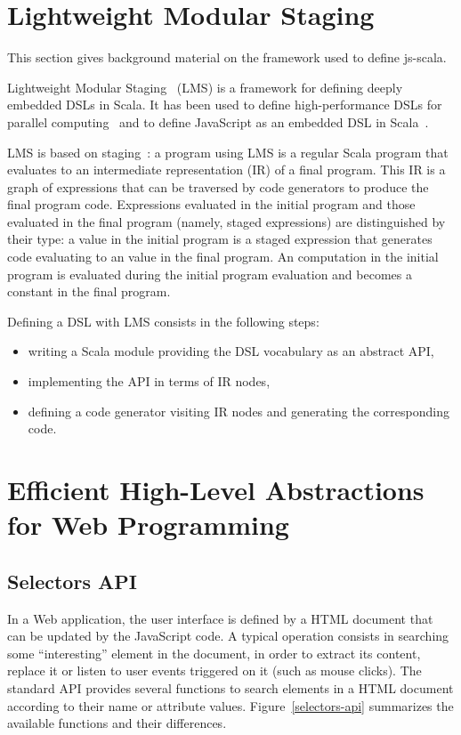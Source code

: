 \documentclass[preprint]{sigplanconf}
\begin{document}
\section{Lightweight Modular Staging}
\label{sec:lms}

This section gives background material on the framework used to define js-scala.

Lightweight Modular Staging~\cite{Rompf12_LMSThesis, Rompf12_LMS} (LMS) is a framework for defining
deeply embedded DSLs in Scala. It has been used to define high-performance DSLs for parallel
computing~\cite{Brown11_Parallel} and to define JavaScript as an embedded DSL in
Scala~\cite{Kossakowski12_JsDESL}.

LMS is based on staging~\cite{Jorring1986_Staging}: a program using LMS is a regular Scala program
that evaluates to an intermediate representation (IR) of a final program. This IR is a graph of
expressions that can be traversed by code generators to produce the final program code. Expressions
evaluated in the initial program and those evaluated in the final program (namely, staged
expressions) are distinguished by their type: a  value in the initial program is a
staged expression that generates code evaluating to an  value in the final program. An
 computation in the initial program is evaluated during the initial program evaluation and
becomes a constant in the final program.

Defining a DSL with LMS consists in the following steps:

\begin{itemize}
 \item writing a Scala module providing the DSL vocabulary as an abstract API,
 \item implementing the API in terms of IR nodes,
 \item defining a code generator visiting IR nodes and generating the corresponding code.
\end{itemize}

\section{Efficient High-Level Abstractions for Web Programming}
\label{sec:contribution}

\subsection{Selectors API}

In a Web application, the user interface is defined by a HTML document that can be updated by the
JavaScript code. A typical operation consists in searching some “interesting” element in the
document, in order to extract its content, replace it or listen to user events triggered on it (such
as mouse clicks). The standard API provides several functions to search elements in a HTML document
according to their name or attribute values. Figure~\ref{selectors-api} summarizes the available
functions and their differences.
\end{document}
